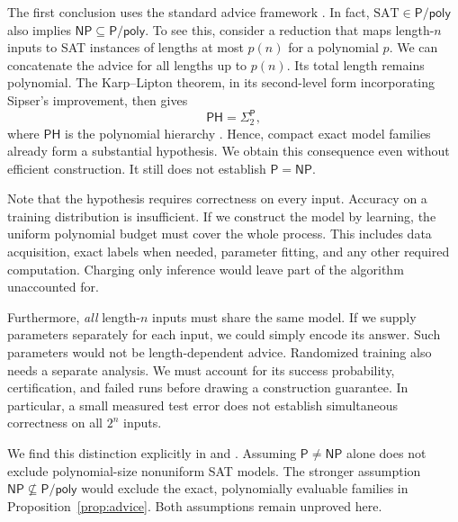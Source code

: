 \documentclass[11pt,a4paper]{article}
\numberwithin{equation}{section}
\newcommand{\Pclass}{\mathsf{P}}
\newcommand{\NPclass}{\mathsf{NP}}
\newcommand{\Ppoly}{\mathsf{P/poly}}
\newcommand{\SAT}{\mathrm{SAT}}
\theoremstyle{plain}
\theoremstyle{definition}
\theoremstyle{remark}
\begin{document}
The first conclusion uses the standard advice framework \citep{karp1980}. In fact, $\SAT\in\Ppoly$ also implies $\NPclass\subseteq\Ppoly$. To see this, consider a reduction that maps length-$n$ inputs to SAT instances of lengths at most $p(n)$ for a polynomial $p$. We can concatenate the advice for all lengths up to $p(n)$. Its total length remains polynomial. The Karp--Lipton theorem, in its second-level form incorporating Sipser's improvement, then gives
\begin{equation}
\mathsf{PH}=\Sigma_2^{\Pclass},
\end{equation}
where $\mathsf{PH}$ is the polynomial hierarchy \citep{karp1982}. Hence, compact exact model families already form a substantial hypothesis. We obtain this consequence even without efficient construction. It still does not establish $\Pclass=\NPclass$.

Note that the hypothesis requires correctness on every input. Accuracy on a training distribution is insufficient. If we construct the model by learning, the uniform polynomial budget must cover the whole process. This includes data acquisition, exact labels when needed, parameter fitting, and any other required computation. Charging only inference would leave part of the algorithm unaccounted for.

Furthermore, \emph{all} length-$n$ inputs must share the same model. If we supply parameters separately for each input, we could simply encode its answer. Such parameters would not be length-dependent advice. Randomized training also needs a separate analysis. We must account for its success probability, certification, and failed runs before drawing a construction guarantee. In particular, a small measured test error does not establish simultaneous correctness on all $2^n$ inputs.

We find this distinction explicitly in \citet{lin2021limitations} and \citet{hertrich2023knapsack}. Assuming $\Pclass\neq\NPclass$ alone does not exclude polynomial-size nonuniform SAT models. The stronger assumption $\NPclass\nsubseteq\Ppoly$ would exclude the exact, polynomially evaluable families in Proposition~\ref{prop:advice}. Both assumptions remain unproved here.
\end{document}
